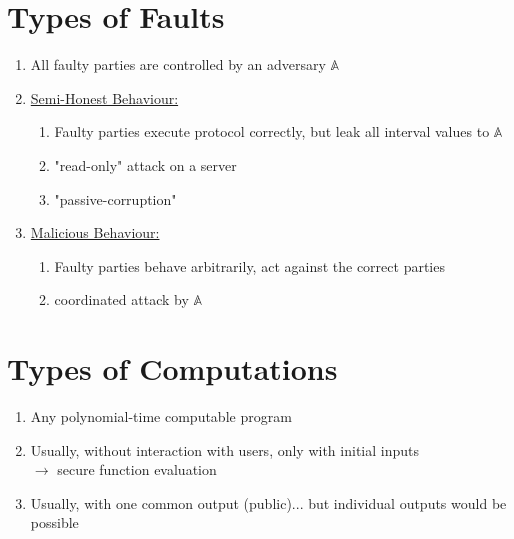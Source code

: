 \documentclass{report}
\begin{document}
 \section{Types of Faults}
 \begin{adjustwidth}{2em}{2em}
 	\begin{enumerate}[\tiny\textbullet]
 		\item All faulty parties are controlled by an adversary $\mathbb{A}$
 		\item \underline{Semi-Honest Behaviour:}
 		\begin{enumerate}[-]
 			\item Faulty parties execute protocol correctly, but leak all interval values to $\mathbb{A}$
 			\item "read-only" attack on a server
 			\item "passive-corruption"
 		\end{enumerate}
 		\item \underline{Malicious Behaviour:}
 		\begin{enumerate}[-]
 			\item Faulty parties behave arbitrarily, act against the correct parties
 			\item coordinated attack by $\mathbb{A}$
 		\end{enumerate}
 	\end{enumerate}
 \end{adjustwidth}
 
 \section{Types of Computations}
 \begin{adjustwidth}{2em}{2em}
 	\begin{enumerate}[\tiny\textbullet]
 		\item Any polynomial-time computable program
 		\item Usually, without interaction with users, only with initial inputs \\
 		$\rightarrow$ secure function evaluation
 		\item Usually, with one common output (public)... but individual outputs would be possible
 	\end{enumerate}
 \end{adjustwidth}
 
\end{document}
